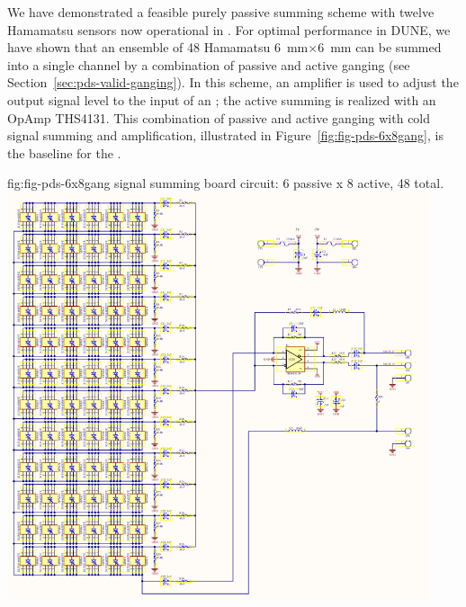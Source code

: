 We have demonstrated a feasible purely passive summing scheme with twelve Hamamatsu  sensors now operational in . For optimal performance in DUNE, we have shown that an ensemble of 48 Hamamatsu \SI{6}{mm}$\times$\SI{6}{mm}  can be summed into a single channel by a combination of passive and active ganging (see Section~\ref{sec:pds-valid-ganging}).  In this scheme, an amplifier is used to adjust the  output signal level to the input of an ; the active summing is realized with an OpAmp THS4131. This combination of passive and active ganging with cold signal summing and amplification, illustrated in Figure~\ref{fig:fig-pds-6x8gang}, is the baseline for the .

\begin{dunefigure}
 {fig:fig-pds-6x8gang}
 { signal summing board circuit: 6 passive  x 8 active, 48  total.}
\includegraphics[height=12cm]{graphics/pds_gang_fig2.png}
\end{dunefigure}




